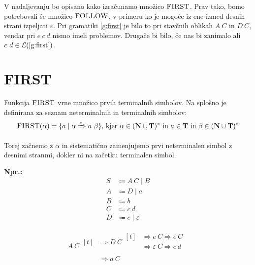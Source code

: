 \documentclass{article}
\newcommand{\Ex}{\textbf{Npr.:}\ }
\newcommand{\FIRST}{\textsc{FIRST}}
\newcommand{\FOLLOW}{\textsc{FOLLOW}}
\newcommand{\Set}[1]{\mathbf{#1}}
\newcommand{\Terminals}{\Set{T}}
\newcommand{\NonTerminals}{\Set{N}}
\newcommand{\Null}{\varepsilon}
\newcommand{\Language}[1]{\mathcal{L}(#1)}
\newcommand{\Arrow}{\Coloneqq}
\newcommand{\Derive}{\Rightarrow}
\newcommand{\DeriveStar}{\xRightarrow{\ast}}
\newcommand{\Seq}{\ }
\newcommand{\Union}{\mathrel{|}}
\newcommand{\Kleene}[1]{#1^\ast}
\begin{document}
V nadaljevanju bo opisano kako izračunamo množico $\FIRST$.
Prav tako, bomo potrebovali še množico $\FOLLOW$, v primeru ko je mogoče iz ene izmed desnih strani izpeljati $\Null$.
Pri gramatiki \ref{g:first} je bilo to pri stavčnih oblikah $A \Seq C$ in $D \Seq C$, vendar pri $e \Seq c \Seq d$ nismo imeli problemov.
Drugače bi bilo, če nas bi zanimalo ali $c \Seq d \in \Language{\text{\ref{g:first}}}$.

\section{\FIRST}

Funkcija $\FIRST$ vrne množico prvih terminalnih simbolov.
Na splošno je definirana za seznam neterminalnih in terminalnih simbolov:
\begin{equation*}
  \FIRST(\alpha) = \{ a \mid \alpha \DeriveStar a \Seq \beta \} \text{, kjer } \alpha \in \Kleene{(\NonTerminals \cup \Terminals)} \text{ in } a \in \Terminals \text{ in } \beta \in \Kleene{(\NonTerminals \cup \Terminals)}
\end{equation*}

Torej začnemo z $\alpha$ in sistematično zamenjujemo prvi neterminalen simbol z desnimi stranmi, dokler ni na začetku terminalen simbol.

\Ex
\begin{equation*}
  \begin{aligned}
    S &\Arrow A \Seq C \Union B \\
    A &\Arrow D \Union a \\
    B &\Arrow b\\
    C &\Arrow c \Seq d\\
    D &\Arrow e \Union \Null
  \end{aligned}
\end{equation*}

\begin{equation*}
  A \Seq C \begin{aligned}[t]
    &\Derive D \Seq C \begin{aligned}[t]
      &\Derive e \Seq C \Derive e \Seq C \\
      &\Derive \Null \Seq C \Derive c \Seq d \\
    \end{aligned}\\
    &\Derive a \Seq C
  \end{aligned}
\end{equation*}
\end{document}
